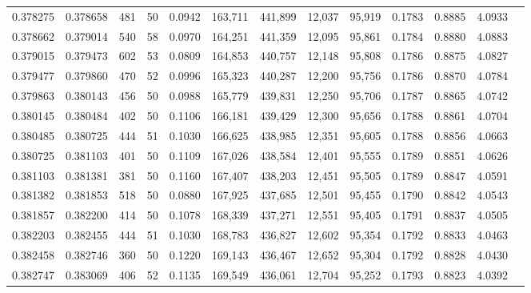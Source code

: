 \begin{tabular}{rrrrrrrrrrrrr}
0.378275 & 0.378658 &   481 &  50 &                                     0.0942 & 163,711 & 441,899 &  12,037 &  95,919 & 0.1783 & 0.8885 & 4.0933 \\
0.378662 & 0.379014 &   540 &  58 &                                     0.0970 & 164,251 & 441,359 &  12,095 &  95,861 & 0.1784 & 0.8880 & 4.0883 \\
0.379015 & 0.379473 &   602 &  53 &                                     0.0809 & 164,853 & 440,757 &  12,148 &  95,808 & 0.1786 & 0.8875 & 4.0827 \\
0.379477 & 0.379860 &   470 &  52 &                                     0.0996 & 165,323 & 440,287 &  12,200 &  95,756 & 0.1786 & 0.8870 & 4.0784 \\
0.379863 & 0.380143 &   456 &  50 &                                     0.0988 & 165,779 & 439,831 &  12,250 &  95,706 & 0.1787 & 0.8865 & 4.0742 \\
0.380145 & 0.380484 &   402 &  50 &                                     0.1106 & 166,181 & 439,429 &  12,300 &  95,656 & 0.1788 & 0.8861 & 4.0704 \\
0.380485 & 0.380725 &   444 &  51 &                                     0.1030 & 166,625 & 438,985 &  12,351 &  95,605 & 0.1788 & 0.8856 & 4.0663 \\
0.380725 & 0.381103 &   401 &  50 &                                     0.1109 & 167,026 & 438,584 &  12,401 &  95,555 & 0.1789 & 0.8851 & 4.0626 \\
0.381103 & 0.381381 &   381 &  50 &                                     0.1160 & 167,407 & 438,203 &  12,451 &  95,505 & 0.1789 & 0.8847 & 4.0591 \\
0.381382 & 0.381853 &   518 &  50 &                                     0.0880 & 167,925 & 437,685 &  12,501 &  95,455 & 0.1790 & 0.8842 & 4.0543 \\
0.381857 & 0.382200 &   414 &  50 &                                     0.1078 & 168,339 & 437,271 &  12,551 &  95,405 & 0.1791 & 0.8837 & 4.0505 \\
0.382203 & 0.382455 &   444 &  51 &                                     0.1030 & 168,783 & 436,827 &  12,602 &  95,354 & 0.1792 & 0.8833 & 4.0463 \\
0.382458 & 0.382746 &   360 &  50 &                                     0.1220 & 169,143 & 436,467 &  12,652 &  95,304 & 0.1792 & 0.8828 & 4.0430 \\
0.382747 & 0.383069 &   406 &  52 &                                     0.1135 & 169,549 & 436,061 &  12,704 &  95,252 & 0.1793 & 0.8823 & 4.0392 \\

\end{tabular}
